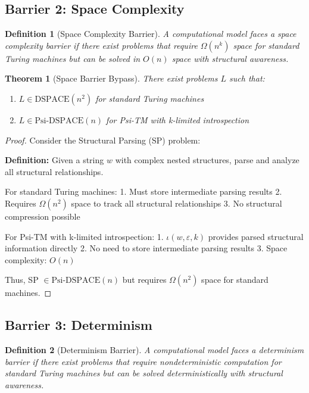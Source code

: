 \documentclass[11pt]{article}
\newtheorem{definition}{Definition}
\newtheorem{theorem}{Theorem}
\begin{document}
\subsection{Barrier 2: Space Complexity}

\begin{definition}[Space Complexity Barrier]
A computational model faces a space complexity barrier if there exist problems that require $\Omega(n^k)$ space for standard Turing machines but can be solved in $O(n)$ space with structural awareness.
\end{definition}

\begin{theorem}[Space Barrier Bypass]
There exist problems $L$ such that:
\begin{enumerate}
\item $L \in \text{DSPACE}(n^2)$ for standard Turing machines
\item $L \in \text{Psi-DSPACE}(n)$ for Psi-TM with k-limited introspection
\end{enumerate}
\end{theorem}

\begin{proof}
Consider the Structural Parsing (SP) problem:

\textbf{Definition:} Given a string $w$ with complex nested structures, parse and analyze all structural relationships.

For standard Turing machines:
1. Must store intermediate parsing results
2. Requires $\Omega(n^2)$ space to track all structural relationships
3. No structural compression possible

For Psi-TM with k-limited introspection:
1. $\iota(w, \varepsilon, k)$ provides parsed structural information directly
2. No need to store intermediate parsing results
3. Space complexity: $O(n)$

Thus, SP $\in \text{Psi-DSPACE}(n)$ but requires $\Omega(n^2)$ space for standard machines.
\end{proof}

\subsection{Barrier 3: Determinism}

\begin{definition}[Determinism Barrier]
A computational model faces a determinism barrier if there exist problems that require nondeterministic computation for standard Turing machines but can be solved deterministically with structural awareness.
\end{definition}
\end{document}
